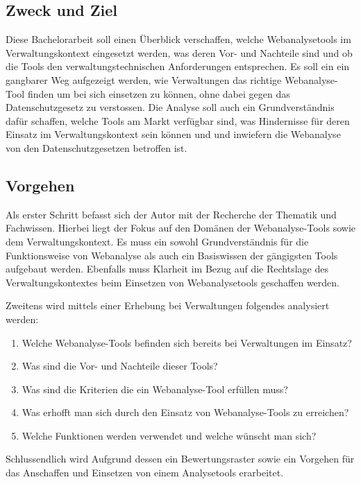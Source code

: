 \subsection{Zweck und Ziel}

Diese Bachelorarbeit soll einen Überblick verschaffen, welche Webanalysetools im Verwaltungskontext eingesetzt werden, was deren Vor- und Nachteile sind und ob die Tools den verwaltungstechnischen Anforderungen entsprechen. Es soll ein ein gangbarer Weg aufgezeigt werden, wie Verwaltungen das richtige Webanalyse-Tool finden um bei sich einsetzen zu können, ohne dabei gegen das Datenschutzgesetz zu verstossen. Die Analyse soll auch ein Grundverständnis dafür schaffen, welche Tools am Markt verfügbar sind, was Hindernisse für deren Einsatz im Verwaltungskontext sein können und und inwiefern die Webanalyse von den Datenschutzgesetzen betroffen ist. 


\subsection{Vorgehen}

Als erster Schritt befasst sich der Autor mit der Recherche der Thematik und Fachwissen. Hierbei liegt der Fokus auf den Domänen der Webanalyse-Tools sowie dem Verwaltungskontext. Es muss ein sowohl Grundverständnis für die Funktionsweise von Webanalyse als auch ein Basiswissen der gängigsten Tools aufgebaut werden. Ebenfalls muss Klarheit im Bezug auf die Rechtslage des Verwaltungskontextes beim Einsetzen von Webanalysetools geschaffen werden.

Zweitens wird mittels einer Erhebung bei Verwaltungen folgendes analysiert werden:

\begin{enumerate}
    \item Welche Webanalyse-Tools befinden sich bereits bei Verwaltungen im Einsatz?
    \item Was sind die Vor- und Nachteile dieser Tools?
    \item Was sind die Kriterien die ein Webanalyse-Tool erfüllen muss?
    \item Was erhofft man sich durch den Einsatz von Webanalyse-Tools zu erreichen?
    \item Welche Funktionen werden verwendet und welche wünscht man sich?
\end{enumerate}

Schlussendlich wird Aufgrund dessen ein Bewertungsraster sowie ein Vorgehen für das Anschaffen und Einsetzen von einem Analysetools erarbeitet. 

